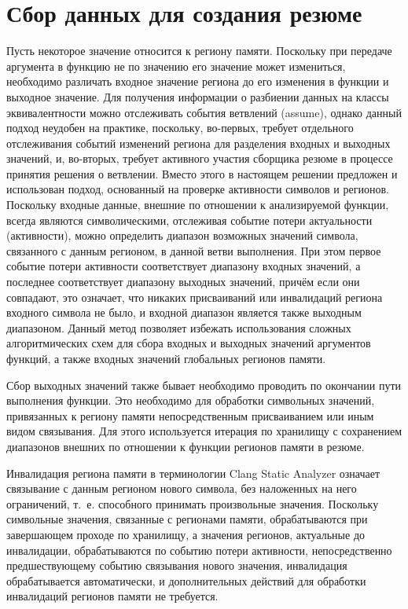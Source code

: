 \section{Сбор данных для создания резюме}

Пусть некоторое значение относится к региону памяти. Поскольку при передаче аргумента в функцию не по значению его значение может измениться, необходимо различать входное значение региона до его изменения в функции и выходное значение. Для получения информации о разбиении данных на классы эквивалентности можно отслеживать события ветвлений (assume), однако данный подход неудобен на практике, поскольку, во-первых, требует отдельного отслеживания событий изменений региона для разделения входных и выходных значений, и, во-вторых, требует активного участия сборщика резюме в процессе принятия решения о ветвлении. Вместо этого в настоящем решении предложен и использован подход, основанный на проверке активности символов и регионов. Поскольку входные данные, внешние по отношении к анализируемой функции, всегда являются символическими, отслеживая событие потери актуальности (активности), можно определить диапазон возможных значений символа, связанного с данным регионом, в данной ветви выполнения. При этом первое событие потери активности соответствует диапазону входных значений, а последнее соответствует диапазону выходных значений, причём если они совпадают, это означает, что никаких присваиваний или инвалидаций региона входного символа не было, и входной диапазон является также выходным диапазоном. Данный метод позволяет избежать использования сложных алгоритмических схем для сбора входных и выходных значений аргументов функций, а также входных значений глобальных регионов памяти.

Сбор выходных значений также бывает необходимо проводить по окончании пути выполнения функции. Это необходимо для обработки символьных значений, привязанных к региону памяти непосредственным присваиванием или иным видом связывания. Для этого используется итерация по хранилищу с сохранением диапазонов внешних по отношении к функции регионов памяти в резюме. 

Инвалидация региона памяти в терминологии Clang Static Analyzer означает связывание с данным регионом нового символа, без наложенных на него ограничений, т.~е. способного принимать произвольные значения. Поскольку символьные значения, связанные с регионами памяти, обрабатываются при завершающем проходе по хранилищу, а значения регионов, актуальные до инвалидации, обрабатываются по событию потери активности, непосредственно предшествующему событию связывания нового значения, инвалидация обрабатывается автоматически, и дополнительных действий для обработки инвалидаций регионов памяти не требуется.

